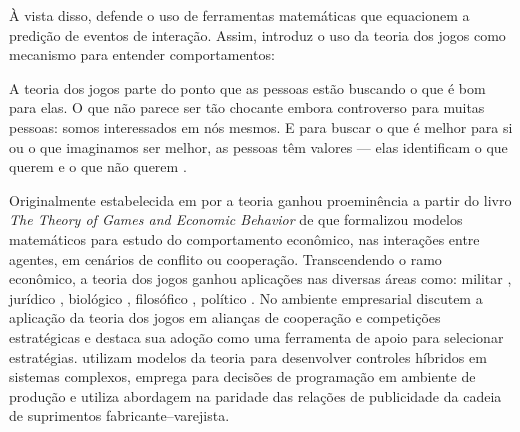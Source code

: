 \documentclass[
	article,			        %
	11pt,				          %
	oneside,			        %
	a4paper,			        %
	english,			        %
	brazil,				        %
	sumario=tradicional
]{abntex2}\usepackage[]{graphicx}\usepackage[]{color}
\begin{document}
À vista disso,  defende o uso de ferramentas matemáticas que equacionem a predição de eventos de interação. Assim, introduz o uso da teoria dos jogos como mecanismo para entender comportamentos:

\begin{citacao}
  A teoria dos jogos parte do ponto que as pessoas estão buscando o que é bom para elas. O que não parece ser tão chocante embora controverso para muitas pessoas: somos interessados em nós mesmos. E para buscar o que é melhor para si ou o que imaginamos ser melhor, as pessoas têm valores --- elas identificam o que querem e o que não querem \cite[min.~2:17--2:37]{MesquitaTED.2009}. 
\end{citacao}

Originalmente estabelecida em \citeyear{Cournot.1838} por  a teoria ganhou proeminência a partir do livro \emph{The Theory of Games and Economic Behavior} de  que formalizou modelos matemáticos para estudo do comportamento econômico, nas interações entre agentes, em cenários de conflito ou cooperação. Transcendendo o ramo econômico, a teoria dos jogos ganhou aplicações nas  diversas áreas como: militar \cite{Haywood.1954,RAND.2004}, jurídico \cite{Rosa.2014}, biológico \cite{Smith.1982}, filosófico \cite{Lewis.2002}, político \cite{Levy.2003}. No ambiente empresarial  discutem a aplicação da teoria dos jogos em alianças de cooperação e competições estratégicas e  destaca sua adoção como uma ferramenta de apoio para selecionar estratégias.  utilizam modelos da teoria para desenvolver controles híbridos em sistemas complexos,  emprega para decisões de programação em ambiente de produção e  utiliza abordagem na paridade das relações de publicidade da cadeia de suprimentos fabricante--varejista.
\end{document}
